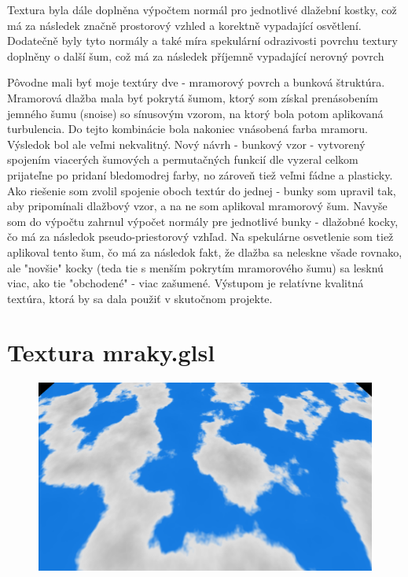 \documentclass[12pt,a4paper,titlepage,final]{report}
\begin{document}
Textura byla dále doplněna výpočtem normál pro jednotlivé dlažební kostky, což má za následek značně prostorový vzhled a korektně vypadající osvětlení. Dodatečně byly tyto normály a také míra spekulární odrazivosti povrchu textury doplněny o další šum, což má za následek příjemně vypadající nerovný povrch

Pôvodne mali byť moje textúry dve - mramorový povrch a bunková štruktúra. Mramorová dlažba mala byť pokrytá šumom, ktorý som získal prenásobením jemného šumu (snoise) so sínusovým vzorom, na ktorý bola potom aplikovaná turbulencia. Do tejto kombinácie bola nakoniec vnásobená farba mramoru. Výsledok bol ale veľmi nekvalitný. Nový návrh - bunkový vzor - vytvorený spojením viacerých šumových a permutačných funkcií dle \cite{gustavson2014} vyzeral celkom prijateľne po pridaní bledomodrej farby, no zároveň tiež veľmi fádne a plasticky. Ako riešenie som zvolil spojenie oboch textúr do jednej - bunky som upravil tak, aby pripomínali dlažbový vzor, a na ne som aplikoval mramorový šum. Navyše som do výpočtu zahrnul výpočet normály pre jednotlivé bunky - dlažobné kocky, čo má za následok pseudo-priestorový vzhľad. Na spekulárne osvetlenie som tiež aplikoval tento šum, čo má za následok fakt, že dlažba sa neleskne všade rovnako, ale "novšie" kocky (teda tie s menším pokrytím mramorového šumu) sa lesknú viac, ako tie "obchodené" - viac zašumené. Výstupom je relatívne kvalitná textúra, ktorá by sa dala použiť v skutočnom projekte.

\section{Textura mraky.glsl}
\begin{figure}[h]
	\captionsetup{type=figure}
	\includegraphics[width=\textwidth]{images/mraky.png}
\end{figure}
\end{document}
